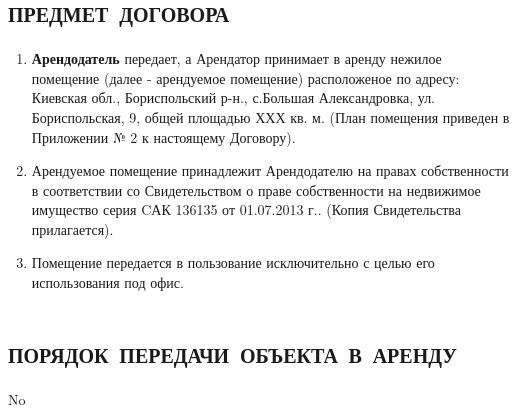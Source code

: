 \section{\large \textbf{\textsc{предмет договора}}}
\begin{enumerate}
\tightlist
\item
  \textbf{Арендодатель} передает, а Арендатор принимает в аренду нежилое
  помещение (далее - арендуемое помещение) расположеное по адресу:
  Киевская обл., Бориспольский р-н., с.Большая Александровка, ул.
  Бориспольская, 9, общей площадью ХХХ кв. м. (План помещения приведен в
  Приложении № 2 к настоящему Договору).
\item
  Арендуемое помещение принадлежит Арендодателю на правах собственности
  в соответствии со Свидетельством о праве собственности на недвижимое
  имущество серия CАК 136135 от 01.07.2013 г.. (Копия Свидетельства
  прилагается).
\item
  Помещение передается в пользование исключительно с целью его
  использования под офис.
\end{enumerate}


\section{\large \textbf{\textsc{порядок передачи объекта в аренду}}}
No





